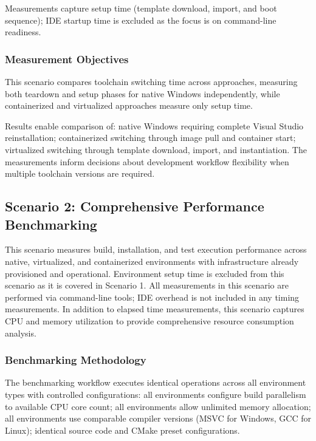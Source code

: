 Measurements capture setup time (template download, import, and boot sequence); IDE startup time is excluded as the focus is on command-line readiness.

\subsubsection{Measurement Objectives}

This scenario compares toolchain switching time across approaches, measuring both teardown and setup phases for native Windows independently, while containerized and virtualized approaches measure only setup time.

Results enable comparison of: native Windows requiring complete Visual Studio reinstallation; containerized switching through image pull and container start; virtualized switching through template download, import, and instantiation.
The measurements inform decisions about development workflow flexibility when multiple toolchain versions are required.

\subsection{Scenario 2: Comprehensive Performance Benchmarking}

This scenario measures build, installation, and test execution performance across native, virtualized, and containerized environments with infrastructure already provisioned and operational.
Environment setup time is excluded from this scenario as it is covered in Scenario 1.
All measurements in this scenario are performed via command-line tools; IDE overhead is not included in any timing measurements.
In addition to elapsed time measurements, this scenario captures CPU and memory utilization to provide comprehensive resource consumption analysis.

\subsubsection{Benchmarking Methodology}

The benchmarking workflow executes identical operations across all environment types with controlled configurations: all environments configure build parallelism to available CPU core count; all environments allow unlimited memory allocation; all environments use comparable compiler versions (MSVC for Windows, GCC for Linux); identical source code and CMake preset configurations.

